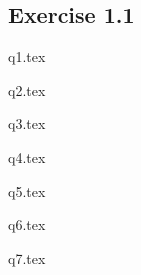 \documentclass[margin=1in,fleqn]{standalone}
\begin{document}
\begin{flexible}
    \subsection{Exercise 1.1}
    {q1.tex}
\end{flexible}

\begin{flexible}
    {q2.tex}
\end{flexible}

\begin{flexible}
    {q3.tex}
\end{flexible}

\begin{flexible}
    {q4.tex}
\end{flexible}

\begin{flexible}
    {q5.tex}
\end{flexible}

\begin{flexible}
    {q6.tex}
\end{flexible}

\begin{flexible}
    {q7.tex}
\end{flexible}
\end{document}
